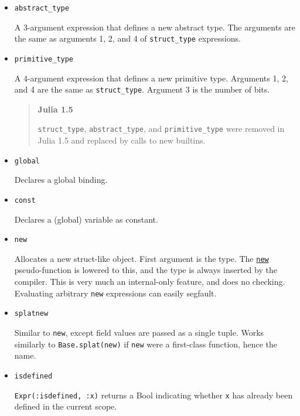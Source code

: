 \begin{itemize}
\begin{itemize}
The number of arguments to initialize. This will be the number of fields, or the minimum number of fields called by an inner constructor{\textquotesingle}s \texttt{new} statement.

\end{itemize}

\item \texttt{abstract\_type}

A 3-argument expression that defines a new abstract type. The arguments are the same as arguments 1, 2, and 4 of \texttt{struct\_type} expressions.


\item \texttt{primitive\_type}

A 4-argument expression that defines a new primitive type. Arguments 1, 2, and 4 are the same as \texttt{struct\_type}. Argument 3 is the number of bits.

\begin{quote}
\textbf{Julia 1.5}

\texttt{struct\_type}, \texttt{abstract\_type}, and \texttt{primitive\_type} were removed in Julia 1.5 and replaced by calls to new builtins.

\end{quote}

\item \texttt{global}

Declares a global binding.


\item \texttt{const}

Declares a (global) variable as constant.


\item \texttt{new}

Allocates a new struct-like object. First argument is the type. The \hyperlink{13888762393600028594}{\texttt{new}} pseudo-function is lowered to this, and the type is always inserted by the compiler.  This is very much an internal-only feature, and does no checking. Evaluating arbitrary \texttt{new} expressions can easily segfault.


\item \texttt{splatnew}

Similar to \texttt{new}, except field values are passed as a single tuple. Works similarly to \texttt{Base.splat(new)} if \texttt{new} were a first-class function, hence the name.


\item \texttt{isdefined}

\texttt{Expr(:isdefined, :x)} returns a Bool indicating whether \texttt{x} has already been defined in the current scope.



\end{itemize}
